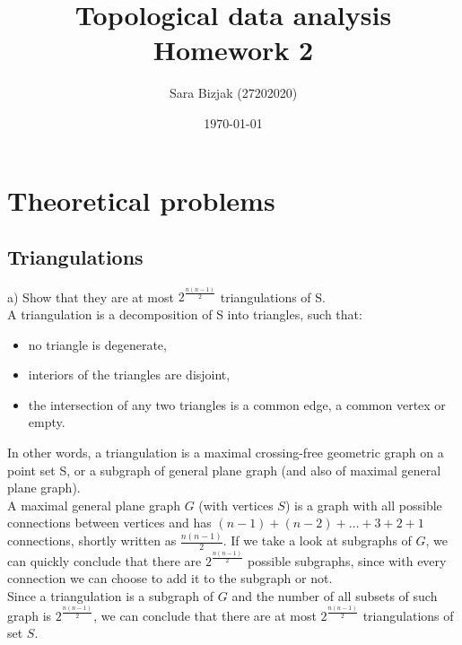 \documentclass[a4paper,11pt]{article}
\title{Topological data analysis \\ Homework 2}
\author{Sara Bizjak (27202020)}
\date{\today}
\begin{document}
\maketitle


\section{Theoretical problems}
\subsection{Triangulations}

\noindent
a) Show that they are at most $ 2^{ \frac{n(n-1)}{2} } $ triangulations of S.
\\
A triangulation is a decomposition of S into triangles, such that:

\begin{itemize}
    \item no triangle is degenerate,
    \item interiors of the triangles are disjoint,
    \item the intersection of any two triangles is a common edge, a common vertex or empty.
\end{itemize}

\noindent
In other words, a triangulation is a maximal crossing-free geometric graph on a point set S, or a subgraph of general plane graph (and also of maximal general plane graph).
\\
A maximal general plane graph $G$ (with vertices $S$) is a graph with all possible connections between vertices and has $(n - 1) + (n - 2) + \ldots + 3 + 2 + 1$ connections, shortly written as $ \frac{n(n - 1)}{2} $.
If we take a look at subgraphs of $G$, we can quickly conclude that there are $ 2 ^ { \frac{n(n-1)}{2}} $ possible subgraphs, since with every connection we can choose to add it to the subgraph or not.
\\
Since a triangulation is a subgraph of $G$ and the number of all subsets of such graph is $ 2 ^ { \frac{n(n-1)}{2}} $, we can conclude that there are at most $ 2 ^ { \frac{n(n-1)}{2}} $ triangulations of set $S$.
\\

\end{document}
